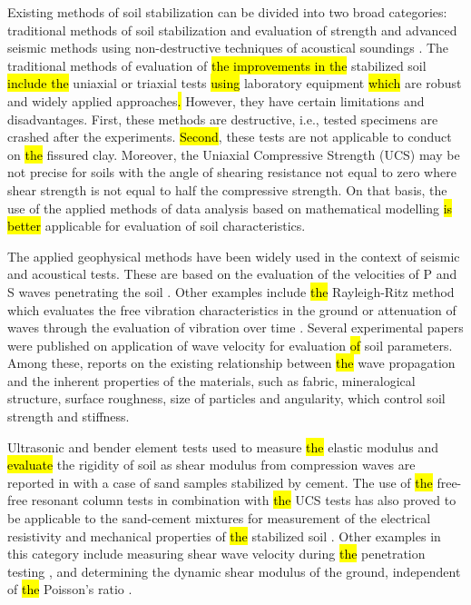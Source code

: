\documentclass[final,3p,times,onecolumn,authoryear]{elsarticle}
\begin{document}
Existing methods of soil stabilization can be divided into two broad categories: traditional methods of soil stabilization and evaluation of strength \citep{Trhl,LindhLemenkova2022a,Heidarizadeh} and advanced seismic methods using non-destructive techniques of acoustical soundings \citep{Varma,Foti,LindhLemenkova2021b,GarciaSuarez}. The traditional methods of evaluation of \hl{the improvements in the }stabilized soil \hl{include the} uniaxial \citep{Avci,Lapointe,XuYi} or triaxial \citep{ALVARADO} tests \hl{using} laboratory equipment \hl{which }are robust and widely applied approaches\hl{. }However, they have certain limitations and disadvantages. First, these methods are destructive, i.e.,\hl{ }tested specimens are crashed after the experiments. \hl{Second}, these tests are not applicable to conduct on \hl{the }fissured clay. Moreover, the Uniaxial Compressive Strength (UCS) may be not precise for soils with the angle of shearing resistance not equal to zero where shear strength is not equal to half the compressive strength. On that basis, the use of the applied methods of data analysis based on mathematical modelling \citep{Jefferies}\hl{ is better} applicable for evaluation of soil characteristics.

The applied geophysical methods have been widely used in the context of seismic and acoustical tests. These are based on the evaluation of the velocities of P and S waves penetrating the soil \citep{Safaee,LindhLemenkova2022c,FotiLancellotta}. Other examples include \hl{the }Rayleigh-Ritz method which evaluates the free vibration characteristics in the ground \citep{SonkarMittal,Jones} or attenuation of waves through the evaluation of vibration over time \citep{Colombero}. Several experimental papers were published on application of wave velocity for evaluation \hl{of }soil parameters. Among these, \cite{Santamarina} reports on the existing relationship between \hl{the }wave propagation and the inherent properties of the materials, such as fabric, mineralogical structure, surface roughness, size of particles and angularity, which control soil strength and stiffness.

Ultrasonic and bender element tests used to measure \hl{the }elastic modulus and \hl{evaluate }the rigidity of soil as shear modulus from compression waves are reported in \cite{Amaral} with a case of sand samples stabilized by cement. The use of \hl{the }free-free resonant column tests in combination with \hl{the }UCS tests has also proved to be applicable to the sand-cement mixtures for measurement of the electrical resistivity and mechanical properties of \hl{the }stabilized soil \citep{Rusati}. Other examples in this category include measuring shear wave velocity during \hl{the }penetration testing \citep{Hepton1989}, and determining the dynamic shear modulus of the ground, independent of \hl{the }Poisson's ratio \citep{Abbiss}. 
\end{document}
